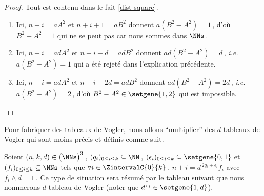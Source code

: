 \begin{proof}
	Tout est contenu dans le fait \ref{dist-square}.
	
	\begin{enumerate}
		\item Ici, $n + i = a A^2$ et $n + i + 1 = a B^2$ donnent $a (B^2 - A^2) = 1$\,, d'où $B^2 - A^2 = 1$ qui ne se peut pas car nous sommes dans $\NNs$.

		\item Ici, $n + i = ad A^2$ et $n + i + d = ad B^2$ donnent $ad (B^2 - A^2) = d$\,, \emph{i.e.} $a (B^2 - A^2) = 1$ qui a été rejeté dans l'explication précédente.

		\item Ici, $n + i = ad A^2$ et $n + i + 2 d = ad B^2$ donnent $ad (B^2 - A^2) = 2d$\,, \emph{i.e.} $a (B^2 - A^2) = 2$\,, d'où $B^2 - A^2 \in \setgene{1, 2}$ qui est impossible.
	\end{enumerate}
\end{proof}




Pour fabriquer des tableaux de Vogler, nous allons \enquote{multiplier} des $d$-tableaux de Vogler qui sont moins précis et définis comme suit.
	

\begin{defi}
	Soient $(n, k, d) \in \big( \NNs \big)^3$\,,
	$( q_i )_{0 \leq i \leq k} \subseteq \NN$\,,
	$( \epsilon_i )_{0 \leq i \leq k} \subseteq \setgene{0, 1}$
	et
	$( f_i )_{0 \leq i \leq k} \subseteq \NNs$
	tels que 
	$\forall i \in \ZintervalC{0}{k}$\,, $n + i = d^{\,2q_i + \epsilon_i} f_i$ avec $f_i \wedge d = 1$\,.
	Ce type de situation sera résumé par le tableau suivant que nous nommerons $d$-tableau de Vogler (noter que $d^{\,\epsilon_i} \in \setgene{1, d}$).

	\begin{center}
	\end{center}
\end{defi}




